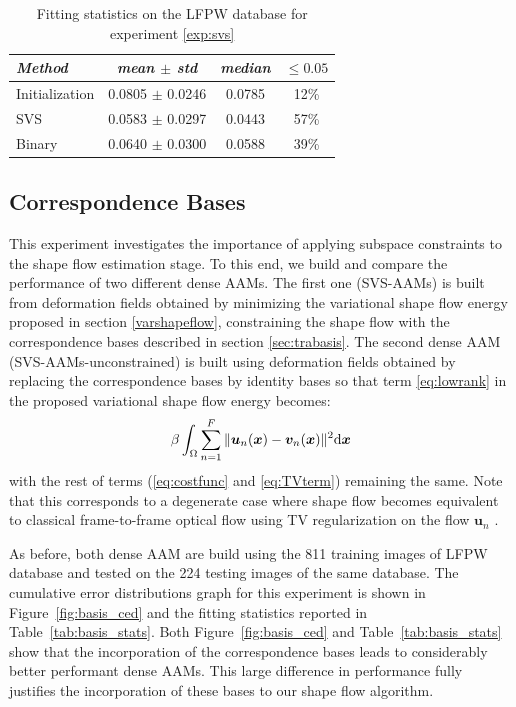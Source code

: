 \begin{table}[t]
\small
\centering
\begin{tabular}{|l|c|c|c|}
\hline
\emph{Method}       & \emph{mean $\pm$ std} & \emph{median} & $\leq 0.05$\\
\hline\hline
Initialization      & 0.0805 $\pm$ 0.0246 & 0.0785 & 12\%\\
SVS                 & 0.0583 $\pm$ 0.0297 & 0.0443 & 57\%\\
Binary              & 0.0640 $\pm$ 0.0300 & 0.0588 & 39\%\\
\hline
\end{tabular}
\caption{Fitting statistics on the LFPW database for experiment \ref{exp:svs}}
\label{tab:svs_stats}
\end{table}

\subsection{Correspondence Bases}
\label{exp:basis}
This experiment investigates the importance of applying subspace constraints to the shape flow estimation stage. To this end, we build and compare the performance of two different dense AAMs. The first one (SVS-AAMs) is built from deformation fields obtained by minimizing the variational shape flow energy proposed in section \ref{varshapeflow}, \ie constraining the shape flow with the correspondence bases described in section \ref{sec:trabasis}. The second dense AAM (SVS-AAMs-unconstrained) is built using deformation fields obtained by replacing the correspondence bases by identity bases so that term \ref{eq:lowrank} in the proposed variational shape flow energy becomes: 
\begin{equation}
\beta \int_{\Omega}\sum_{n=1}^F\|\bm{u}_n(\boldsymbol{x})-\bm{v}_n(\boldsymbol{x})\|^2 \mathrm{d} \boldsymbol{x} \label{}
\end{equation}
with the rest of terms (\ref{eq:costfunc} and \ref{eq:TVterm}) remaining the same. Note that this corresponds to a degenerate case where shape flow becomes equivalent to classical frame-to-frame optical flow using TV regularization on the flow $\bm{u}_n$ \cite{Garg:2013hu}.

As before, both dense AAM are build using the 811 training images of LFPW database and tested on the 224 testing images of the same database. The cumulative error distributions graph for this experiment is shown in Figure~\ref{fig:basis_ced} and the fitting statistics reported in Table~\ref{tab:basis_stats}. 
Both Figure~\ref{fig:basis_ced} and Table~\ref{tab:basis_stats} show that the incorporation of the correspondence bases leads to considerably better performant dense AAMs. This large difference in performance fully justifies the incorporation of these bases to our shape flow algorithm.

